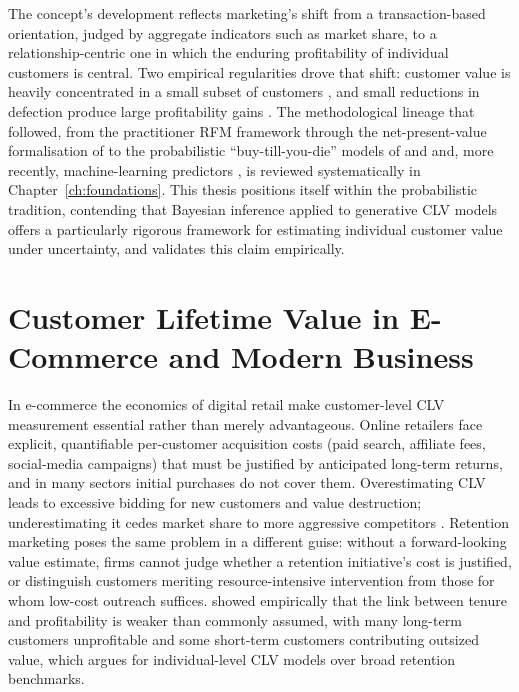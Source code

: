 \documentclass[12pt, a4paper, oneside]{report}
\begin{document}
The concept's development reflects marketing's shift from a transaction-based orientation, judged by aggregate indicators such as market share, to a relationship-centric one in which the enduring profitability of individual customers is central. Two empirical regularities drove that shift: customer value is heavily concentrated in a small subset of customers \parencite{storbacka1997}, and small reductions in defection produce large profitability gains \parencite{reichheld1990}. The methodological lineage that followed, from the practitioner RFM framework \parencite{hughes1994} through the net-present-value formalisation of \textcite{dwyer1989} to the probabilistic ``buy-till-you-die'' models of \textcite{schmittlein1987} and \textcite{fader2005} and, more recently, machine-learning predictors \parencite{chamberlain2017}, is reviewed systematically in Chapter~\ref{ch:foundations}. This thesis positions itself within the probabilistic tradition, contending that Bayesian inference applied to generative CLV models offers a particularly rigorous framework for estimating individual customer value under uncertainty, and validates this claim empirically.

\section{Customer Lifetime Value in E-Commerce and Modern Business}
\label{sec:ecommerce}

In e-commerce the economics of digital retail make customer-level CLV measurement essential rather than merely advantageous. Online retailers face explicit, quantifiable per-customer acquisition costs (paid search, affiliate fees, social-media campaigns) that must be justified by anticipated long-term returns, and in many sectors initial purchases do not cover them. Overestimating CLV leads to excessive bidding for new customers and value destruction; underestimating it cedes market share to more aggressive competitors \parencite{gupta2006}. Retention marketing poses the same problem in a different guise: without a forward-looking value estimate, firms cannot judge whether a retention initiative's cost is justified, or distinguish customers meriting resource-intensive intervention from those for whom low-cost outreach suffices. \textcite{reinartz2000} showed empirically that the link between tenure and profitability is weaker than commonly assumed, with many long-term customers unprofitable and some short-term customers contributing outsized value, which argues for individual-level CLV models over broad retention benchmarks.
\end{document}
